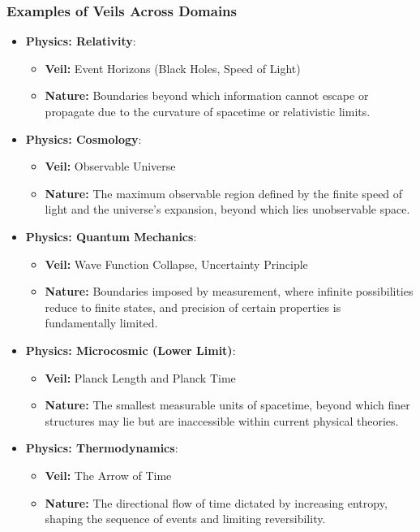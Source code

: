 \documentclass[12pt]{article}
\begin{document}
\subsubsection{Examples of Veils Across Domains}

\begin{itemize}
    \item \textbf{Physics: Relativity}:
    \begin{itemize}
        \item \textbf{Veil:} Event Horizons (Black Holes, Speed of Light)
        \item \textbf{Nature:} Boundaries beyond which information cannot escape or propagate due to the curvature of spacetime or relativistic limits.
    \end{itemize}

    \item \textbf{Physics: Cosmology}:
    \begin{itemize}
        \item \textbf{Veil:} Observable Universe
        \item \textbf{Nature:} The maximum observable region defined by the finite speed of light and the universe's expansion, beyond which lies unobservable space.
    \end{itemize}

    \item \textbf{Physics: Quantum Mechanics}:
    \begin{itemize}
        \item \textbf{Veil:} Wave Function Collapse, Uncertainty Principle
        \item \textbf{Nature:} Boundaries imposed by measurement, where infinite possibilities reduce to finite states, and precision of certain properties is fundamentally limited.
    \end{itemize}

    \item \textbf{Physics: Microcosmic (Lower Limit)}:
    \begin{itemize}
        \item \textbf{Veil:} Planck Length and Planck Time
        \item \textbf{Nature:} The smallest measurable units of spacetime, beyond which finer structures may lie but are inaccessible within current physical theories.
    \end{itemize}
    
    \item \textbf{Physics: Thermodynamics}:
    \begin{itemize}
        \item \textbf{Veil:} The Arrow of Time
        \item \textbf{Nature:} The directional flow of time dictated by increasing entropy, shaping the sequence of events and limiting reversibility.
    \end{itemize}


\end{itemize}
\end{document}
